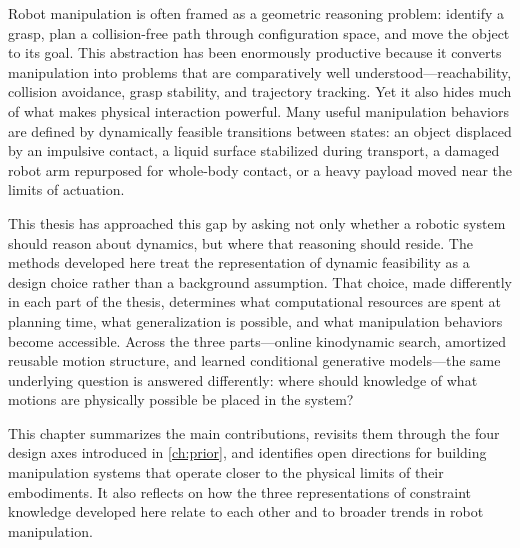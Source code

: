 Robot manipulation is often framed as a geometric reasoning problem: identify a grasp, plan a collision-free path through configuration space, and move the object to its goal.
This abstraction has been enormously productive because it converts manipulation into problems that are comparatively well understood---reachability, collision avoidance, grasp stability, and trajectory tracking.
Yet it also hides much of what makes physical interaction powerful.
Many useful manipulation behaviors are defined by dynamically feasible transitions between states: an object displaced by an impulsive contact, a liquid surface stabilized during transport, a damaged robot arm repurposed for whole-body contact, or a heavy payload moved near the limits of actuation.

This thesis has approached this gap by asking not only whether a robotic system should reason about dynamics, but where that reasoning should reside.
The methods developed here treat the representation of dynamic feasibility as a design choice rather than a background assumption.
That choice, made differently in each part of the thesis, determines what computational resources are spent at planning time, what generalization is possible, and what manipulation behaviors become accessible.
Across the three parts---online kinodynamic search, amortized reusable motion structure, and learned conditional generative models---the same underlying question is answered differently: where should knowledge of what motions are physically possible be placed in the system?

This chapter summarizes the main contributions, revisits them through the four design axes introduced in \cref{ch:prior}, and identifies open directions for building manipulation systems that operate closer to the physical limits of their embodiments.
It also reflects on how the three representations of constraint knowledge developed here relate to each other and to broader trends in robot manipulation.
